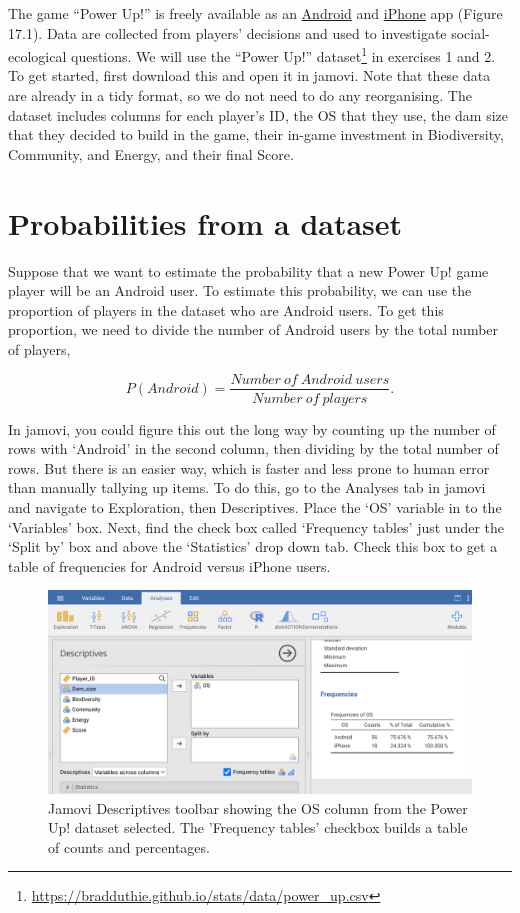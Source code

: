 \documentclass[
]{scrbook}
\begin{document}
The game ``Power Up!'' is freely available as an \href{https://play.google.com/store/apps/details?id=com.hyperluminal.stirlinguniversity.sustainabledevelopmentgame}{Android} and \href{https://apps.apple.com/gb/app/power-up/id1585634888}{iPhone} app (Figure 17.1).
Data are collected from players' decisions and used to investigate social-ecological questions.
We will use the ``Power Up!'' dataset\footnote{\url{https://bradduthie.github.io/stats/data/power_up.csv}} in exercises 1 and 2.
To get started, first download this and open it in jamovi.
Note that these data are already in a tidy format, so we do not need to do any reorganising.
The dataset includes columns for each player's ID, the OS that they use, the dam size that they decided to build in the game, their in-game investment in Biodiversity, Community, and Energy, and their final Score.

\hypertarget{probabilities-from-a-dataset}{%
\section{Probabilities from a dataset}\label{probabilities-from-a-dataset}}

Suppose that we want to estimate the probability that a new Power Up! game player will be an Android user.
To estimate this probability, we can use the proportion of players in the dataset who are Android users.
To get this proportion, we need to divide the number of Android users by the total number of players,

\[P(Android) = \frac{Number\:of\:Android\:users}{Number\:of\:players}.\]

In jamovi, you could figure this out the long way by counting up the number of rows with `Android' in the second column, then dividing by the total number of rows.
But there is an easier way, which is faster and less prone to human error than manually tallying up items.
To do this, go to the Analyses tab in jamovi and navigate to Exploration, then Descriptives.
Place the `OS' variable in to the `Variables' box.
Next, find the check box called `Frequency tables' just under the `Split by' box and above the `Statistics' drop down tab.
Check this box to get a table of frequencies for Android versus iPhone users.

\begin{figure}
\includegraphics[width=1\linewidth]{img/jamovi_power_up_frequencies} \caption{Jamovi Descriptives toolbar showing the OS column from the Power Up! dataset selected. The 'Frequency tables' checkbox builds a table of counts and percentages.}\label{fig:unnamed-chunk-71}
\end{figure}
\end{document}
